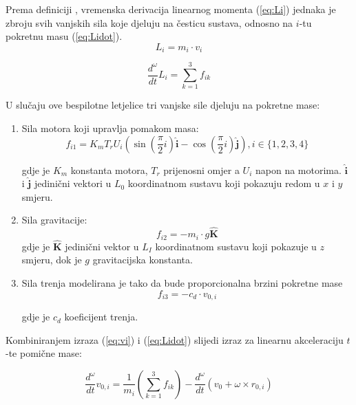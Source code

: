 \documentclass[11pt,a4paper]{article}
\begin{document}
Prema definiciji \cite{ilijic}, vremenska derivacija linearnog momenta (\ref{eq:Li}) jednaka je zbroju svih vanjskih sila koje djeluju na česticu sustava, odnosno na $i$-tu pokretnu masu (\ref{eq:Lidot}). 
\begin{equation}
 {L_{i} = m_{i} \cdot v_{i}}
\label{eq:Li}
\end{equation}

\begin{equation}
 {\frac{d^{\omega}}{dt} L_{i} = \sum_{k=1}^{3}f_{ik}}
\label{eq:Lidot}
\end{equation}

U slučaju ove bespilotne letjelice tri vanjske sile djeluju na pokretne mase:

\begin{enumerate}
 \item Sila motora koji upravlja pomakom masa:
\begin{equation}
f_{i1}  =K_{m}T_{r}U_{i}\left(\sin\left(\frac{\pi}{2}i\right) \bm{\hat{i}} - \cos\left( \frac{\pi}{2}i\right) \bm{\hat{j}}\right), i \in \{1,2,3,4\}
\label{eq:fi1}
\end{equation}

gdje je $K_{m}$ konstanta motora, $T_{r}$ prijenosni omjer a $U_{i}$ napon na motorima.  $\bm{\hat{i}}$ i  $\bm{\hat{j}}$ jedinični vektori u $L_{0}$ koordinatnom sustavu koji pokazuju redom u $x$ i $y$ smjeru.

\item Sila gravitacije:
\begin{equation}
f_{i2} = -m_{i}\cdot g \bm{\hat{K}}
\label{eq:fi2}
\end{equation}
gdje je  $\bm{\hat{K}}$ jedinični vektor u $L_{I}$ koordinatnom sustavu koji pokazuje u $z$ smjeru, dok je $g$ gravitacijska konstanta. 

\item Sila trenja modelirana je tako da bude proporcionalna brzini pokretne mase
\begin{equation}
f_{i3} = -c_{d} \cdot v_{0,i}
\label{eq:fi3}
\end{equation}

gdje je $c_{d}$ koeficijent trenja.

\end{enumerate}

Kombiniranjem izraza (\ref{eq:vi}) i (\ref{eq:Lidot}) slijedi izraz za linearnu akceleraciju $t$-te pomične mase:

\begin{equation}
\frac{d^{\omega}}{dt}v_{0,i} = \frac{1}{m_{i}}\left(\sum_{k=1}^{3}f_{ik}\right) - \frac{d^{\omega}}{dt} \left( v_{0} + \omega \times r_{0,i} \right) 
\label{eq:voidot}
\end{equation}
\end{document}
